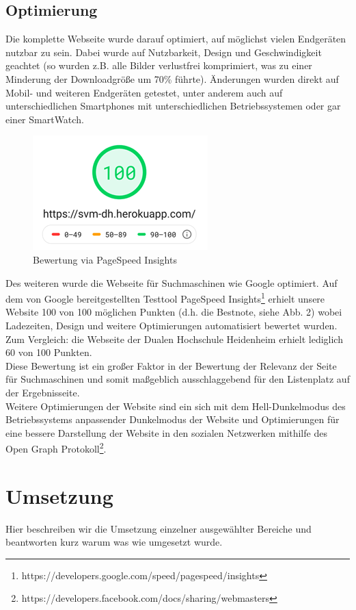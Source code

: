 \documentclass[12pt,a4paper]{article}
\begin{document}
\subsection{Optimierung}
Die komplette Webseite wurde darauf optimiert, auf möglichst vielen Endgeräten nutzbar zu sein. Dabei wurde auf Nutzbarkeit, Design und Geschwindigkeit geachtet (so wurden z.B. alle Bilder verlustfrei komprimiert, was zu einer Minderung der Downloadgröße um 70\% führte). Änderungen wurden direkt auf Mobil- und weiteren Endgeräten getestet, unter anderem auch auf unterschiedlichen Smartphones mit unterschiedlichen Betriebssystemen oder gar einer SmartWatch.
\begin{figure}[!htbp]
\centering
	\includegraphics[scale=1]{Bewertung.png}
	\caption{Bewertung via PageSpeed Insights}
	\label{img:Bewertung}
\end{figure}
Des weiteren wurde die Webseite für Suchmaschinen wie Google optimiert. Auf dem von Google bereitgestellten Testtool \dq PageSpeed Insights\dq \footnote{\label{foot:4} https://developers.google.com/speed/pagespeed/insights} erhielt unsere Website 100 von 100 möglichen Punkten (d.h. die Bestnote, siehe Abb. 2) wobei Ladezeiten, Design und weitere Optimierungen automatisiert bewertet wurden. Zum Vergleich: die Webseite der Dualen Hochschule Heidenheim erhielt lediglich 60 von 100 Punkten. \\
Diese Bewertung ist ein großer Faktor in der Bewertung der Relevanz der Seite für Suchmaschinen und somit maßgeblich ausschlaggebend für den Listenplatz auf der Ergebnisseite. \\
Weitere Optimierungen der Website sind ein sich mit dem Hell-\/Dunkelmodus des Betriebssystems anpassender Dunkelmodus der Website und Optimierungen für eine bessere Darstellung der Website in den sozialen Netzwerken mithilfe des Open Graph Protokoll\footnote{\label{foot:5} https://developers.facebook.com/docs/sharing/webmasters}.

\section{Umsetzung}
Hier beschreiben wir die Umsetzung einzelner ausgewählter Bereiche und beantworten kurz warum was wie umgesetzt wurde.
\end{document}
